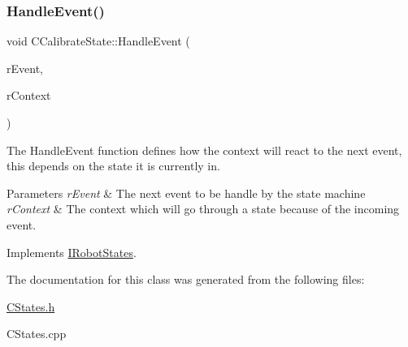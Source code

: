 \mbox{\label{classCCalibrateState_af24b30b6357a7b48f1157afdc0662984}} 
\subsubsection{\texorpdfstring{Handle\+Event()}{HandleEvent()}}
{\footnotesize\ttfamily void C\+Calibrate\+State\+::\+Handle\+Event (\begin{DoxyParamCaption}\item[{\hyperlink{classCEvent}{C\+Event} \&}]{r\+Event,  }\item[{\hyperlink{classCRobotContext}{C\+Robot\+Context} \&}]{r\+Context }\end{DoxyParamCaption})\hspace{0.3cm}{\ttfamily [virtual]}}



The Handle\+Event function defines how the context will react to the next event, this depends on the state it is currently in. 


\begin{DoxyParams}{Parameters}
{\em r\+Event} & The next event to be handle by the state machine \\
\hline
{\em r\+Context} & The context which will go through a state because of the incoming event. \\
\hline
\end{DoxyParams}


Implements \hyperlink{classIRobotStates_a0b6c28a3deed04f93371a9395022f1ed}{I\+Robot\+States}.



The documentation for this class was generated from the following files\+:\begin{DoxyCompactItemize}
\item 
\hyperlink{CStates_8h}{C\+States.\+h}\item 
C\+States.\+cpp\end{DoxyCompactItemize}
